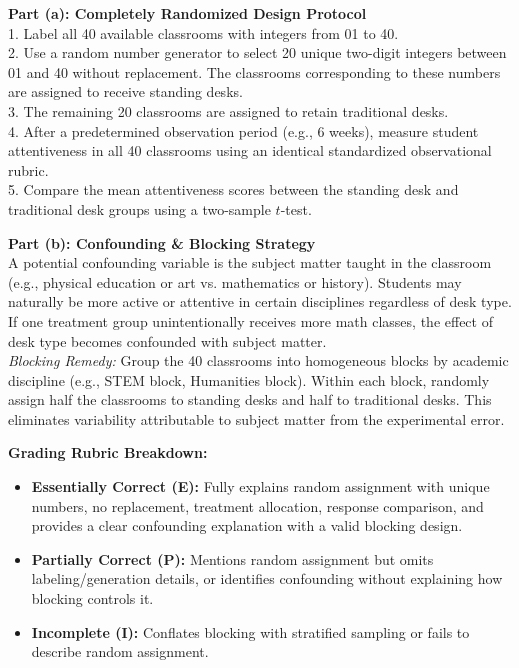 \begin{frqrubricbox}
\textbf{Part (a): Completely Randomized Design Protocol}\\
1. Label all 40 available classrooms with integers from 01 to 40.\\
2. Use a random number generator to select 20 unique two-digit integers between 01 and 40 without replacement. The classrooms corresponding to these numbers are assigned to receive standing desks.\\
3. The remaining 20 classrooms are assigned to retain traditional desks.\\
4. After a predetermined observation period (e.g., 6 weeks), measure student attentiveness in all 40 classrooms using an identical standardized observational rubric.\\
5. Compare the mean attentiveness scores between the standing desk and traditional desk groups using a two-sample $t$-test.

\textbf{Part (b): Confounding \& Blocking Strategy}\\
A potential confounding variable is the subject matter taught in the classroom (e.g., physical education or art vs. mathematics or history). Students may naturally be more active or attentive in certain disciplines regardless of desk type. If one treatment group unintentionally receives more math classes, the effect of desk type becomes confounded with subject matter.\\
\textit{Blocking Remedy:} Group the 40 classrooms into homogeneous blocks by academic discipline (e.g., STEM block, Humanities block). Within each block, randomly assign half the classrooms to standing desks and half to traditional desks. This eliminates variability attributable to subject matter from the experimental error.

\textbf{Grading Rubric Breakdown:}\\
\begin{itemize}
  \item \textbf{Essentially Correct (E):} Fully explains random assignment with unique numbers, no replacement, treatment allocation, response comparison, and provides a clear confounding explanation with a valid blocking design.
  \item \textbf{Partially Correct (P):} Mentions random assignment but omits labeling/generation details, or identifies confounding without explaining how blocking controls it.
  \item \textbf{Incomplete (I):} Conflates blocking with stratified sampling or fails to describe random assignment.
\end{itemize}
\end{frqrubricbox}

